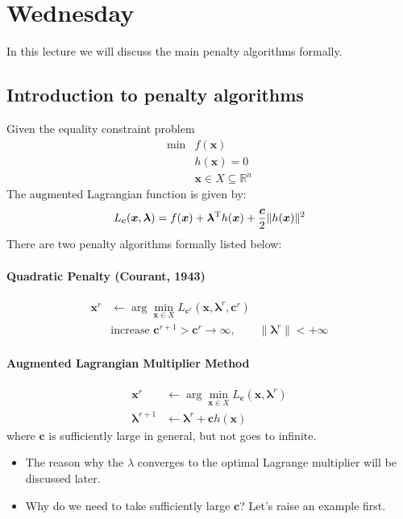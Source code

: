 \section{Wednesday}
In this lecture we will discuss the main penalty algorithms formally.
\subsection{Introduction to penalty algorithms}
Given the equality constraint problem
\begin{equation}\label{Eq:10:10}
\begin{array}{ll}
\min&f(\bm x)\\
&h(\bm x)=0\\
&\bm x\in X\subseteq\mathbb{R}^n
\end{array}
\end{equation}
The augmented Lagrangian function is given by:
\begin{equation}
L_{\bm c}(\bm x,\bm\lambda)=f(\bm x)+\bm\lambda^{\mathrm T} h(\bm x)+\frac{\bm c}{2}\|h(\bm x)\|^2
\end{equation}
There are two penalty algorithms formally listed below:
\paragraph{Quadratic Penalty (Courant, 1943)} 
\begin{align*}
\bm x^r&\leftarrow\arg\min_{\bm x\in X} L_{\bm c^r}(\bm x,\bm\lambda^r,\bm c^r)\\
&\mbox{increase $\bm c^{r+1}>\bm c^r$}\to\infty,\qquad
\|\bm\lambda^r\|<+\infty
\end{align*}

\paragraph{Augmented Lagrangian Multiplier Method}
\begin{align*}
\bm x^r&\leftarrow\arg\min_{\bm x\in X}L_{\bm c}(\bm x,\bm\lambda^r)\\
\bm\lambda^{r+1}&\leftarrow\bm\lambda^r+\bm c h(\bm x)
\end{align*}
where $\bm c$ is sufficiently large in general, but not goes to infinite. 
\begin{itemize}
\item
The reason why the $\lambda$ converges to the optimal Lagrange multiplier will be discussed later.
\item
Why do we need to take sufficiently large $\bm c$? Let's raise an example first.
\end{itemize}

